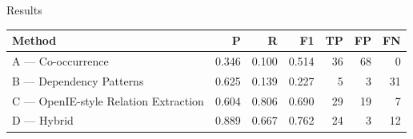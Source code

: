 \documentclass[aspectratio=169,11pt]{beamer}
\begin{document}
\begin{frame}{Results}
      \small
      \begin{center}
        \begin{tabular}{lrrrrrr}
          \toprule
          \textbf{Method} & \textbf{P} & \textbf{R} & \textbf{F1} & \textbf{TP} & \textbf{FP} & \textbf{FN} \\
          \midrule
          A --- Co-occurrence  & 0.346 & 0.100 & 0.514 & 36 & 68 & 0 \\
          B --- Dependency Patterns & 0.625 & 0.139 & 0.227 & 5  & 3  & 31 \\
          C --- OpenIE-style Relation Extraction & 0.604 & 0.806 & 0.690 & 29 & 19 & 7  \\
          D --- Hybrid   & 0.889 & 0.667 & 0.762 & 24 & 3  & 12 \\
          \bottomrule
        \end{tabular}
      \end{center}
    
      
\end{frame}
\end{document}
